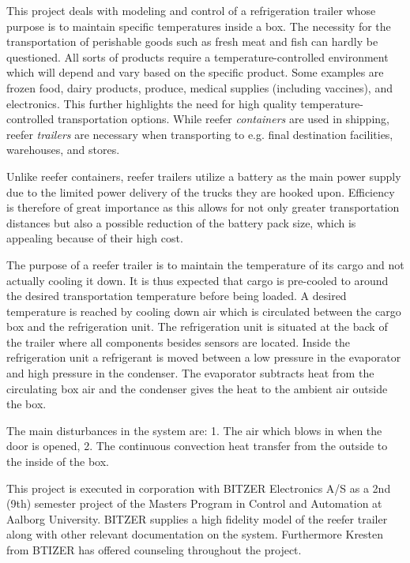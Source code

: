 This project deals with modeling and control of a refrigeration trailer whose purpose is to maintain specific temperatures inside a box. The necessity for the transportation of perishable goods such as fresh meat and fish can hardly be questioned. All sorts of products require a temperature-controlled environment which will depend and vary based on the specific product. Some examples are frozen food, dairy products, produce, medical supplies (including vaccines), and electronics. This further highlights the need for high quality temperature-controlled transportation options. While reefer \textit{containers} are used in shipping, reefer \textit{trailers} are necessary when transporting to e.g. final destination facilities, warehouses, and stores.

Unlike reefer containers, reefer trailers utilize a battery as the main power supply due to the limited power delivery of the trucks they are hooked upon. Efficiency is therefore of great importance as this allows for not only greater transportation distances but also a possible reduction of the battery pack size, which is appealing because of their high cost.

The purpose of a reefer trailer is to maintain the temperature of its cargo and not actually cooling it down. It is thus expected that cargo is pre-cooled to around the desired transportation temperature before being loaded. A desired temperature is reached by cooling down air which is circulated between the cargo box and the refrigeration unit. The refrigeration unit is situated at the back of the trailer where all components besides sensors are located. Inside the refrigeration unit a refrigerant is moved between a low pressure in the evaporator and high pressure in the condenser. The evaporator subtracts heat from the circulating box air and the condenser gives the heat to the ambient air outside the box.

The main disturbances in the system are: 1. The air which blows in when the door is opened, 2. The continuous convection heat transfer from the outside to the inside of the box.

This project is executed in corporation with BITZER Electronics A/S as a 2nd (9th) semester project of the Masters Program in Control and Automation at Aalborg University. BITZER supplies a high fidelity model of the reefer trailer along with other relevant documentation on the system. Furthermore Kresten from BTIZER has offered counseling throughout the project.

